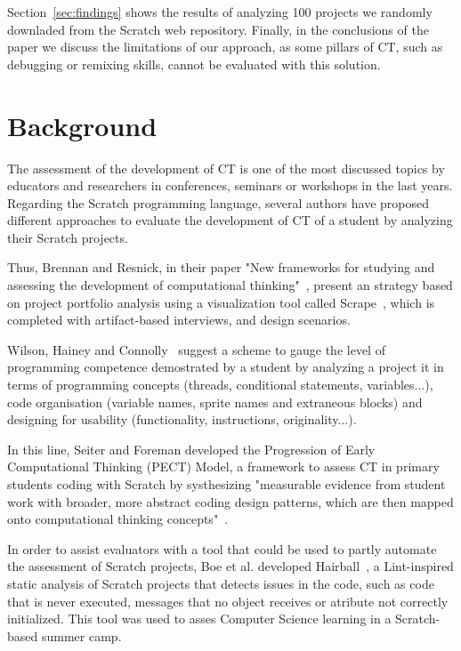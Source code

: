 \documentclass[a4paper,11pt]{article}
\begin{document}
Section~\ref{sec:findings} shows the results of analyzing 100 projects we randomly downladed from the Scratch web repository. Finally, in the conclusions of the paper we discuss the limitations of our approach, as some pillars of CT, such as debugging or remixing skills, cannot be evaluated with this solution.


\section{Background}
\label{sec:background}
The assessment of the development of CT is one of the most discussed topics by educators and researchers in conferences, seminars or workshops in the last years. Regarding the Scratch programming language, several authors have proposed different approaches to evaluate the development of CT of a student by analyzing their Scratch projects. 

Thus, Brennan and Resnick, in their paper "New frameworks for studying and assessing the development of computational thinking"~\cite{brennan2012new}, present an strategy based on project portfolio analysis using a visualization tool called Scrape~\cite{wolz2011scrape}, which is completed with artifact-based interviews, and design scenarios.

Wilson, Hainey and Connolly~\cite{wilson2012evaluation} suggest a scheme to gauge the level of programming competence demostrated by a student by analyzing a project it in terms of programming concepts (threads, conditional statements, variables...), code organisation (variable names, sprite names and extraneous blocks) and designing for usability (functionality, instructions, originality...).

In this line, Seiter and Foreman developed the Progression of Early Computational Thinking (PECT) Model, a framework to assess CT in primary students coding with Scratch by systhesizing "measurable evidence from student work with broader, more abstract coding design patterns, which are then mapped onto computational thinking concepts"~\cite{seiter2013modeling}.

In order to assist evaluators with a tool that could be used to partly automate the assessment of Scratch projects, Boe et al. developed Hairball~\cite{boe2013hairball}, a Lint-inspired static analysis of Scratch projects that detects issues in the code, such as code that is never executed, messages that no object receives or atribute not correctly initialized. This tool was used to asses Computer Science learning in a Scratch-based summer camp\cite{franklin2013assessment}. 
\end{document}
